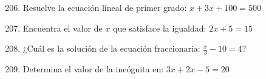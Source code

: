 \documentclass[10pt,a4paper]{article}
\begin{document}
\begin{enumerate}[label=\textbf{\arabic*.}]
\setcounter{enumi}{205}
\item Resuelve la ecuación lineal de primer grado: \(x + 3x + 100 = 500\)
\begin{enumerate}[label=\textbf{\Alph*)}]
\end{enumerate}
\vspace{0.15cm}
\item Encuentra el valor de \(x\) que satisface la igualdad: \(2x + 5 = 15\)
\begin{enumerate}[label=\textbf{\Alph*)}]
\end{enumerate}
\vspace{0.15cm}
\item ¿Cuál es la solución de la ecuación fraccionaria: \(\frac{x}{3} - 10 = 4\)?
\begin{enumerate}[label=\textbf{\Alph*)}]
\end{enumerate}
\vspace{0.15cm}
\item Determina el valor de la incógnita en: \(3x + 2x - 5 = 20\)
\begin{enumerate}[label=\textbf{\Alph*)}]

\end{enumerate}
\end{enumerate}
\end{document}
